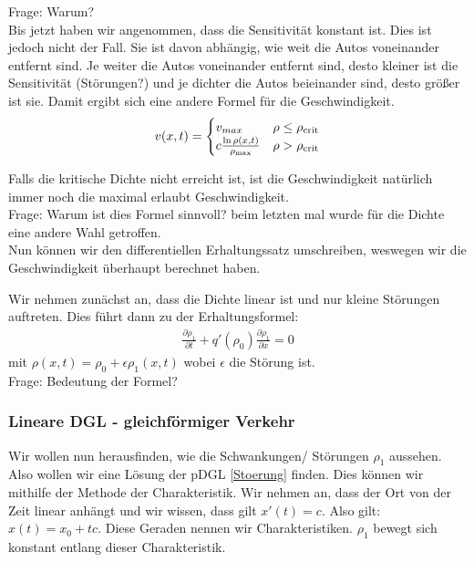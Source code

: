 \documentclass[]{article}
\begin{document}
Frage: Warum? \\

Bis jetzt haben wir angenommen, dass die Sensitivität konstant ist. Dies ist jedoch nicht der Fall. Sie ist davon abhängig, wie weit die Autos voneinander entfernt sind. Je weiter die Autos voneinander entfernt sind, desto kleiner ist die Sensitivität (Störungen?) und je dichter die Autos beieinander sind, desto größer ist sie. Damit ergibt sich eine andere Formel für die Geschwindigkeit. 
\begin{align*}
v(x,t)= 
\begin{cases}
v_{max} & \rho \le \rho_{\text{crit}} \\
\-c \frac{\ln \rho(x,t)}{\rho_{\text{max}}} & \rho > \rho_{\text{crit}}
\end{cases}
\end{align*}

Falls die kritische Dichte nicht erreicht ist, ist die Geschwindigkeit natürlich immer noch die maximal erlaubt Geschwindigkeit. \\

 Frage: Warum ist dies Formel sinnvoll? beim letzten mal wurde für die Dichte eine andere Wahl getroffen. \\ 

Nun können wir den differentiellen Erhaltungssatz umschreiben, weswegen wir die Geschwindigkeit überhaupt berechnet haben. 

Wir nehmen zunächst an, dass die Dichte linear ist und nur kleine Störungen auftreten. Dies führt dann zu der Erhaltungsformel:
\begin{align}
\label{Stoerung}
	\frac{\partial \rho_1}{\partial t} + q'(\rho_0) \frac{\partial \rho_1}{\partial x}=0
\end{align}
mit $\rho(x,t)= \rho_0 + \epsilon \rho_1(x,t)$ wobei $\epsilon$ die Störung ist. \\

Frage: Bedeutung der Formel? 

\subsubsection*{Lineare DGL - gleichförmiger Verkehr}

Wir wollen nun herausfinden, wie die Schwankungen/ Störungen $\rho_1$ aussehen. Also wollen wir eine Lösung der pDGL \ref{Stoerung} finden. Dies können wir mithilfe der Methode der Charakteristik. Wir nehmen an, dass der Ort von der Zeit linear anhängt und wir wissen, dass gilt $x'(t)=c$. Also gilt: $x(t)=x_0+tc$. Diese Geraden nennen wir Charakteristiken. $\rho_1$ bewegt sich konstant entlang dieser Charakteristik. \\
\end{document}

